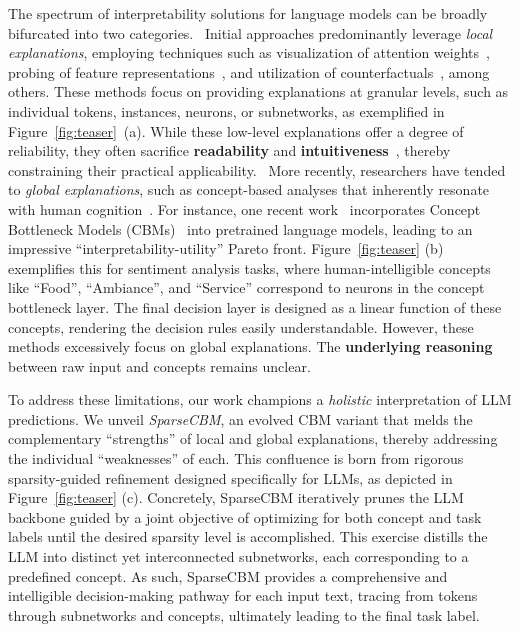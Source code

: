 \documentclass[letterpaper]{article} %
\begin{document}
The spectrum of interpretability solutions for language models can be broadly bifurcated into two categories. 
~Initial approaches predominantly leverage \textit{local explanations}, employing techniques such as visualization of attention weights~\cite{galassi2020attention}, probing of feature representations~\cite{mishra2017local,lundberg2017unified}, and utilization of counterfactuals~\cite{wu2021polyjuice,ross2021explaining}, among others.
These methods focus on providing explanations at granular levels, such as individual tokens, instances, neurons, or subnetworks, as exemplified in Figure~\ref{fig:teaser}~(a). While these low-level explanations offer a degree of reliability, they often sacrifice \textbf{readability} and \textbf{intuitiveness}~\citep{losch2019interpretability}, thereby constraining their practical applicability. ~More recently, researchers have tended to \textit{global explanations}, such as concept-based analyses that inherently resonate with human cognition~\citep{wang2023intepreting,abraham2022cebab}. For instance, one recent work~\citep{tan2023cbm} incorporates Concept Bottleneck Models (CBMs)~\citep{koh2020concept} into pretrained language models, leading to an impressive ``interpretability-utility'' Pareto front. Figure~\ref{fig:teaser} (b) exemplifies this for sentiment analysis tasks, where human-intelligible concepts like ``Food'', ``Ambiance'', and ``Service'' correspond to neurons in the concept bottleneck layer. The final decision layer is designed as a linear function of these concepts, rendering the decision rules easily understandable. However, these methods excessively focus on global explanations. The \textbf{underlying reasoning} between raw input and concepts remains unclear.


To address these limitations, our work champions a \textit{holistic} interpretation of LLM predictions. We unveil \textit{SparseCBM}, an evolved CBM variant that melds the complementary ``strengths'' of local and global explanations, thereby addressing the individual ``weaknesses'' of each. This confluence is born from rigorous sparsity-guided refinement designed specifically for LLMs, as depicted in Figure~\ref{fig:teaser} (c). Concretely, SparseCBM iteratively prunes the LLM backbone guided by a joint objective of optimizing for both concept and task labels until the desired sparsity level is accomplished. This exercise distills the LLM into distinct yet interconnected subnetworks, each corresponding to a predefined concept. As such, SparseCBM provides a comprehensive and intelligible decision-making pathway for each input text, tracing from tokens through subnetworks and concepts, ultimately leading to the final task label.
\end{document}
